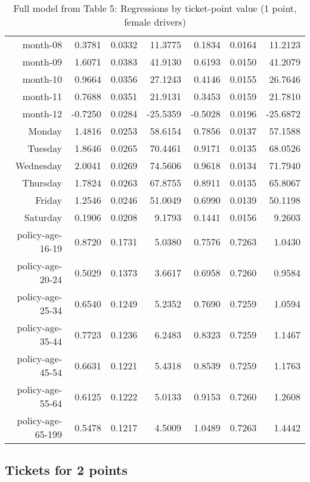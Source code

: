 \documentclass[10pt]{article}
\begin{document}
\begin{table}[ht]
\begin{tabular}{rrrrrrr}
  month-08 & 0.3781 & 0.0332 & 11.3775 & 0.1834 & 0.0164 & 11.2123 \\ 
  month-09 & 1.6071 & 0.0383 & 41.9130 & 0.6193 & 0.0150 & 41.2079 \\ 
  month-10 & 0.9664 & 0.0356 & 27.1243 & 0.4146 & 0.0155 & 26.7646 \\ 
  month-11 & 0.7688 & 0.0351 & 21.9131 & 0.3453 & 0.0159 & 21.7810 \\ 
  month-12 & -0.7250 & 0.0284 & -25.5359 & -0.5028 & 0.0196 & -25.6872 \\ 
  Monday & 1.4816 & 0.0253 & 58.6154 & 0.7856 & 0.0137 & 57.1588 \\ 
  Tuesday & 1.8646 & 0.0265 & 70.4461 & 0.9171 & 0.0135 & 68.0526 \\ 
  Wednesday & 2.0041 & 0.0269 & 74.5606 & 0.9618 & 0.0134 & 71.7940 \\ 
  Thursday & 1.7824 & 0.0263 & 67.8755 & 0.8911 & 0.0135 & 65.8067 \\ 
  Friday & 1.2546 & 0.0246 & 51.0049 & 0.6990 & 0.0139 & 50.1198 \\ 
  Saturday & 0.1906 & 0.0208 & 9.1793 & 0.1441 & 0.0156 & 9.2603 \\ 
  policy-age-16-19 & 0.8720 & 0.1731 & 5.0380 & 0.7576 & 0.7263 & 1.0430 \\ 
  policy-age-20-24 & 0.5029 & 0.1373 & 3.6617 & 0.6958 & 0.7260 & 0.9584 \\ 
  policy-age-25-34 & 0.6540 & 0.1249 & 5.2352 & 0.7690 & 0.7259 & 1.0594 \\ 
  policy-age-35-44 & 0.7723 & 0.1236 & 6.2483 & 0.8323 & 0.7259 & 1.1467 \\ 
  policy-age-45-54 & 0.6631 & 0.1221 & 5.4318 & 0.8539 & 0.7259 & 1.1763 \\ 
  policy-age-55-64 & 0.6125 & 0.1222 & 5.0133 & 0.9153 & 0.7260 & 1.2608 \\ 
  policy-age-65-199 & 0.5478 & 0.1217 & 4.5009 & 1.0489 & 0.7263 & 1.4442 \\ 
   \hline
\end{tabular}
\caption{Full model from Table 5: Regressions by ticket-point value (1 point, female drivers)} 
\label{tab_5_1_pts_F}
\end{table}


\clearpage
\pagebreak




\subsection*{Tickets for 2 points}
\end{document}
